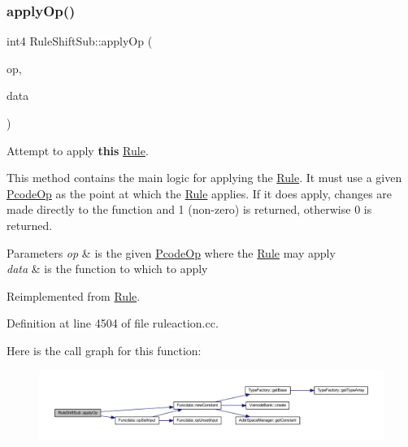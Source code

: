 \subsubsection{\texorpdfstring{applyOp()}{applyOp()}}
{\footnotesize\ttfamily int4 Rule\+Shift\+Sub\+::apply\+Op (\begin{DoxyParamCaption}\item[{\mbox{\hyperlink{class_pcode_op}{Pcode\+Op}} $\ast$}]{op,  }\item[{\mbox{\hyperlink{class_funcdata}{Funcdata}} \&}]{data }\end{DoxyParamCaption})\hspace{0.3cm}{\ttfamily [virtual]}}



Attempt to apply {\bfseries{this}} \mbox{\hyperlink{class_rule}{Rule}}. 

This method contains the main logic for applying the \mbox{\hyperlink{class_rule}{Rule}}. It must use a given \mbox{\hyperlink{class_pcode_op}{Pcode\+Op}} as the point at which the \mbox{\hyperlink{class_rule}{Rule}} applies. If it does apply, changes are made directly to the function and 1 (non-\/zero) is returned, otherwise 0 is returned. 
\begin{DoxyParams}{Parameters}
{\em op} & is the given \mbox{\hyperlink{class_pcode_op}{Pcode\+Op}} where the \mbox{\hyperlink{class_rule}{Rule}} may apply \\
\hline
{\em data} & is the function to which to apply \\
\hline
\end{DoxyParams}


Reimplemented from \mbox{\hyperlink{class_rule_a4e3e61f066670175009f60fb9dc60848}{Rule}}.



Definition at line 4504 of file ruleaction.\+cc.

Here is the call graph for this function\+:
\nopagebreak
\begin{figure}[H]
\begin{center}
\leavevmode
\includegraphics[width=350pt]{class_rule_shift_sub_aea3b654c2ff4472bdb597f16d660df9c_cgraph}
\end{center}
\end{figure}
\mbox{\label{class_rule_shift_sub_acc0a74c73acbe73c52f554e527d0eccb}} 
